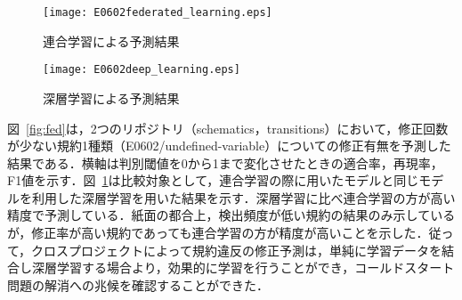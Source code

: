 \documentclass[uplatex,dvipdfmx,a4paper,twocolumn,base=11pt,jbase=11pt,ja=standard]{bxjsarticle}  %
\begin{document}
\begin{figure}
\begin{center}
\texttt{[image: E0602federated\_learning.eps]}
\vspace{-3mm}
\caption{連合学習による予測結果}
\label{fig:fed}
\end{center}

\vspace{-8mm}

\begin{center}
\texttt{[image: E0602deep\_learning.eps]}
\vspace{-3mm}
\caption{深層学習による予測結果}
\label{fig:deep}
\end{center}
\vspace{-12mm}
\end{figure}






図~\ref{fig:fed}は，2つのリポジトリ（schematics，transitions）において，修正回数が少ない規約1種類（E0602/undefined-variable）についての修正有無を予測した結果である．横軸は判別閾値を0から1まで変化させたときの適合率，再現率，F1値を示す．図~\ref{fig:deep}は比較対象として，連合学習の際に用いたモデルと同じモデルを利用した深層学習を用いた結果を示す．深層学習に比べ連合学習の方が高い精度で予測している．紙面の都合上，検出頻度が低い規約の結果のみ示しているが，修正率が高い規約であっても連合学習の方が精度が高いことを示した．従って，クロスプロジェクトによって規約違反の修正予測は，単純に学習データを結合し深層学習する場合より，効果的に学習を行うことができ，コールドスタート問題の解消への兆候を確認することができた．
\end{document}
